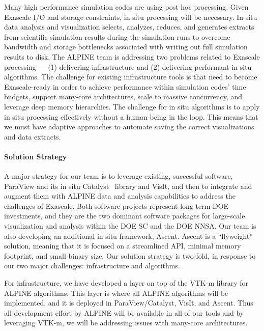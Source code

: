 Many high performance simulation codes are using post hoc processing.  
Given Exascale I/O and storage constraints, in situ processing will be necessary. 
In situ data analysis and visualization selects, analyzes, reduces, and generates extracts from scientific simulation results during the simulation runs to overcome bandwidth and storage bottlenecks associated with writing out full simulation results to disk. 
The ALPINE team is addressing two problems related to Exascale processing --- (1) delivering infrastructure and (2) delivering performant in situ algorithms.
The challenge for existing infrastructure tools is that need to become Exascale-ready in order to achieve performance within simulation codes’ time budgets, support many-core architectures, scale to massive concurrency, and leverage deep memory hierarchies. The challenge for in situ algorithms is to apply in situ processing effectively without a human being in the loop.
This means that we must have adaptive approaches to automate saving the correct visualizations and data extracts.


\paragraph{Solution Strategy}

A major strategy for our team is to leverage existing, successful software, ParaView and its in situ Catalyst~\cite{Catalyst} library and VisIt, and then to integrate and augment them with ALPINE data and analysis capabilities to address the challenges of Exascale. 
%
Both software projects represent long-term DOE investments, and they are the two dominant software packages for large-scale visualization and analysis within the DOE SC and the DOE NNSA. 
%
Our team is also developing an additional  in situ framework, Ascent.  Ascent is a ``flyweight'' solution, meaning that it is focused on a streamlined API, minimal memory footprint, and small binary size.
Our solution strategy is two-fold, in response to our two major challenges: infrastructure and algorithms.

For infrastructure, we have developed a layer on top of the VTK-m library for ALPINE algorithms.
This layer is where all ALPINE algorithms will be implemented, and it is deployed in ParaView/Catalyst, VisIt, and Ascent.
Thus all development effort by ALPINE will be available in all of our tools and by leveraging VTK-m, we will be addressing issues with many-core architectures.  

